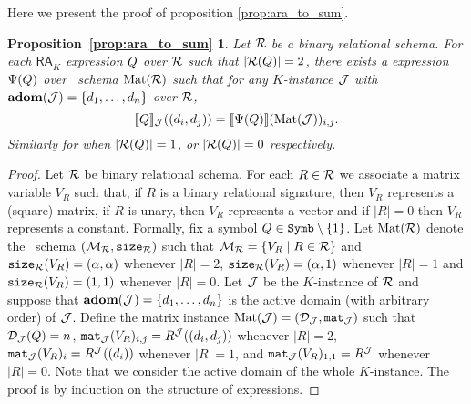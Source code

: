 \newtheorem*{ARATOSUM}{Proposition~\ref{prop:ara_to_sum}}

Here we present the proof of proposition \ref{prop:ara_to_sum}.

\begin{ARATOSUM}
  Let $\mathcal{R}$ be a binary relational schema. For each $\mathsf{RA}_{K}^+$  expression $Q$ over $\mathcal{R}$  such that $|\mathcal{R}(Q)| = 2$, there exists a \langsum  expression $\Psi(Q)$ over \lang \ schema $\text{Mat}(\mathcal{R})$ such that for any $K$-instance $\mathcal{J}$ with $\mathbf{adom}(\mathcal{J}) = \{d_1, \ldots, d_n\}$ over $\mathcal{R}$,
	$$
	\llbracket Q \rrbracket_{\mathcal{J}}((d_i, d_j))=\llbracket \Psi(Q) \rrbracket(\text{Mat}(\mathcal{J}))_{i,j}.
	$$
	Similarly for when $|\mathcal{R}(Q)| = 1$, or $|\mathcal{R}(Q)| = 0$ respectively.
\end{ARATOSUM}

\begin{proof}
Let $\mathcal{R}$ be binary relational schema. For each $R\in \mathcal{R}$ we associate a matrix variable 
$V_R$ such that, if $R$ is a binary relational signature, then $V_R$ represents a (square) matrix, 
if $R$ is unary, then $V_R$ represents a vector and if $|R|=0$ then $V_R$ represents a constant. Formally, 
fix a symbol $Q \in \texttt{Symb} \setminus \{1\}$. Let $\text{Mat}(\mathcal{R})$ denote the \lang \ schema
$(\mathcal{M}_{\mathcal{R}},\texttt{size}_{\mathcal{R}})$ such that $\mathcal{M}_{\mathcal{R}} = \{ V_R \mid R \in \mathcal{R}\}$ and $\texttt{size}_{\mathcal{R}}(V_R) = (\alpha, \alpha)$ 
whenever $|R| = 2$, $\texttt{size}_{\mathcal{R}}(V_R) = (\alpha, 1)$ whenever $|R|=1$ and $\texttt{size}_{\mathcal{R}}(V_R) = (1, 1)$ whenever $|R|=0$. 
Let $\mathcal{J}$ be the $K$-instance of $\mathcal{R}$ and suppose that $\mathbf{adom}(\mathcal{J}) = \{d_1, \ldots, d_n\}$ is 
the active domain (with arbitrary order) of $\mathcal{J}$. 
Define the matrix instance $\text{Mat}(\mathcal{J}) = (\mathcal{D}_{\mathcal{J}},\texttt{mat}_{\mathcal{J}})$ such 
that $\mathcal{D}_{\mathcal{J}}(Q) = n$, $\texttt{mat}_{\mathcal{J}}(V_R)_{i,j} = R^{\mathcal{J}}((d_i, d_j))$ whenever $|R|=2$, $\texttt{mat}_{\mathcal{J}}(V_R)_{i} = R^{\mathcal{J}}((d_i))$ 
whenever $|R|=1$, 
and $\texttt{mat}_{\mathcal{J}}(V_R)_{1,1} = R^{\mathcal{J}}$ whenever $|R|=0$. 
Note that we consider the active domain of the whole $K$-instance.
The proof is by induction on the structure of expressions.



\end{proof}
